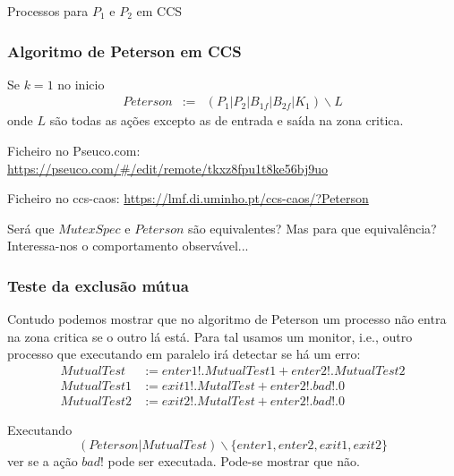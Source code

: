 \documentclass[aspectratio=169]{beamer}
\begin{document}
\begin{frame}{Processos para $P_1$ e $P_2$ em CCS}
\end{frame}

\begin{frame}
\frametitle{Algoritmo de Peterson em CCS} 

	Se $k=1$ no inicio
\begin{eqnarray*}
Peterson&:=&(P_1|P_2|B_{1f}|B_{2f}|K_1)\backslash L	
\end{eqnarray*}
onde $L$ são todas as ações excepto as de entrada e saída na zona critica.

Ficheiro no Pseuco.com:
 \url{https://pseuco.com/\#/edit/remote/tkxz8fpu1t8ke56bj9uo}

Ficheiro no ccs-caos:
 \url{https://lmf.di.uminho.pt/ccs-caos/?Peterson}


 Será que $MutexSpec$ e $Peterson$ são equivalentes? Mas para que equivalência? Interessa-nos o comportamento observável...
\end{frame}

\begin{frame}
	\frametitle{Teste da exclusão mútua}
	Contudo podemos mostrar que no algoritmo de Peterson um processo não entra na zona critica se o outro lá está. Para tal usamos um monitor, i.e., outro processo que executando em paralelo irá detectar se há um erro:
	\begin{align*}
		MutualTest &:= enter1!.MutualTest1 + enter2!.MutualTest2\\
MutualTest1&:= exit1!.MutalTest + enter2!.bad!.0\\
MutualTest2&:= exit2!.MutalTest + enter2!.bad!.0
\end{align*}

Executando 
$$(Peterson|MutualTest)\backslash \{enter1,enter2,exit1,exit2\}$$
ver se a ação $bad!$ pode ser executada. Pode-se mostrar que não.

\end{frame}
\end{document}
